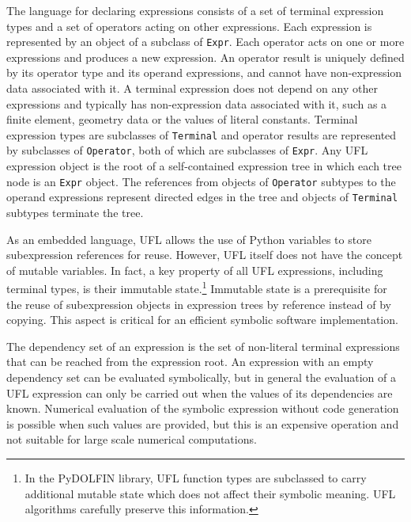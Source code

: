 \documentclass[prodmode,acmtoms]{acmsmall}
\newcommand{\uflc}[1]{\texttt{#1}}
\begin{document}
The language for declaring expressions consists of a set of terminal
expression types and a set of operators acting on other expressions.
Each expression is represented by an object of a subclass of \uflc{Expr}.
Each operator acts on one or more expressions and produces a new
expression. An operator result is uniquely defined by its operator
type and its operand expressions, and cannot have non-expression data
associated with it. A terminal expression does not depend on any other
expressions and typically has non-expression data associated with it,
such as a finite element, geometry data or the values of literal
constants. Terminal expression types are subclasses of \uflc{Terminal} and
operator results are represented by subclasses of \uflc{Operator}, both of
which are subclasses of \uflc{Expr}. Any UFL expression object is the root of
a self-contained expression tree in which each tree node is an \uflc{Expr}
object. The references from objects of \uflc{Operator} subtypes to the
operand expressions represent directed edges in the tree and objects
of \uflc{Terminal} subtypes terminate the tree.

As an embedded language, UFL allows the use of Python variables to
store subexpression references for reuse. However, UFL itself does not
have the concept of mutable variables. In fact, a key property of all
UFL expressions, including terminal types, is their immutable
state.\footnote{In the PyDOLFIN library, UFL function types are
  subclassed to carry additional mutable state which does
  not affect their symbolic meaning. UFL algorithms carefully
  preserve this information.}
Immutable state is a prerequisite for
the reuse of subexpression objects in expression trees by reference
instead of by copying. This aspect is critical for an efficient
symbolic software implementation.

The dependency set of an expression is the set of non-literal terminal
expressions that can be reached from the expression root.  An expression
with an empty dependency set can be evaluated symbolically, but in
general the evaluation of a UFL expression can only be carried out when
the values of its dependencies are known. Numerical evaluation of the
symbolic expression without code generation is possible when such values
are provided, but this is an expensive operation and not suitable for
large scale numerical computations.
\end{document}
